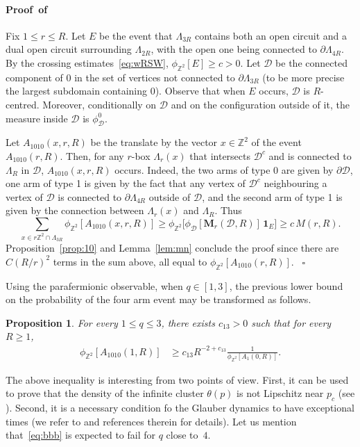 \documentclass[a4paper,oneside,11pt]{article}
\newtheorem{proposition}[theorem]{Proposition}
\numberwithin{equation}{section}
\numberwithin{equation}{section}
\numberwithin{equation}{section}
\newenvironment{proof}[1][\relax]%
  {\paragraph{Proof\ifx#1\relax\else~of #1\fi}}%
  {~\hfill$\square$\par\bigskip}
\newcommand{\calD}{\mathcal{D}}
\newcommand{\bbZ}{\mathbb{Z}}
\newcommand{\La}{\Lambda}
\newcommand{\ind}{\boldsymbol 1}
\begin{document}
\begin{proof}
Fix $1\le r\le R$. 
Let $E$ be the event that $\La_{3R}$ contains both an open circuit and a dual open circuit surrounding $\La_{2R}$, with the open one being connected to $\partial \La_{4R}$. 
By the crossing estimates~\eqref{eq:wRSW}, $\phi_{\bbZ^2}[E]\ge c>0$.
Let $\calD$ be the connected component of $0$ in the set of vertices not connected to $\partial\Lambda_{3R}$ (to be more precise the largest subdomain containing 0). Observe that when $E$ occurs, $\calD$ is $R$-centred. 
Moreover, conditionally on $\calD$ and on the configuration outside of it, the measure inside $\calD$ is $\phi_{\calD}^0$. 


Let $A_{1010}(x,r,R)$ be  the translate by the vector $x \in \bbZ^2$ of the event $A_{1010}(r,R)$.
Then, for any $r$-box $\La_r(x)$ that intersects $\calD^c$ and is connected to $\Lambda_R$ in $\calD$, $A_{1010}(x,r,R)$ occurs. 
Indeed, the two arms of type 0 are given by $\partial \calD$, 
one arm of type 1 is given by the fact that any vertex of $\calD^c$ neighbouring a vertex of $\calD$ is connected to $\partial \La_{4R}$ outside of $\calD$, 
and the second arm of type 1 is given by the connection between $\La_r(x)$ and $\La_R$.
Thus
\begin{equation}\label{eq:pro}
    \sum_{x\in r\mathbb Z^2 \cap \La_{3R}}\phi_{\bbZ^2}[A_{1010}(x,r,R)]
    \ge \phi_{\bbZ^2}\big[\phi_{\calD}[\mathbf M_r(\calD,R)]\,\ind_E\big]
    \ge c\,M(r,R).
\end{equation}
Proposition~\ref{prop:10} and Lemma~\ref{lem:mn}  conclude the proof since there are $C(R/r)^2$ terms in the sum above, all equal to $\phi_{\bbZ^2}[A_{1010}(r,R)]$. 
\end{proof}


Using the parafermionic observable, when $q\in [1,3]$, 
the previous lower bound on the probability of the four arm event may be transformed as follows. 

\begin{proposition}\label{prop:beta}
	For every $1\le q\le 3$,  there exists $c_{13}>0$ such that for every $R\ge1$,
    \begin{align}\label{eq:bbb}
    	\phi_{\bbZ^2}[A_{1010}(1,R)]&\ge c_{13}R^{-2 + c_{13}}\tfrac1{\phi_{\bbZ^2}[A_1(0,R)]}.
	\end{align}
\end{proposition}

The above inequality is interesting from two points of view. 
First, it can be used to prove that the density of the infinite cluster $\theta(p)$ is not Lipschitz near $p_c$ (see \cite{DumMan20}).
Second, it is a necessary condition fo the Glauber dynamics to have exceptional times (we refer to \cite{GPS} and references therein for details). 
Let us mention that~\eqref{eq:bbb} is expected to fail for $q$ close to~$4$.
\end{document}
